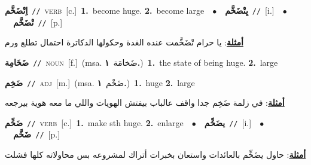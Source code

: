\documentclass[10pt,a4paper,twoside]{article} %
\begin{document}
\begin{multicols}{2}
{{{{{{{{{{\setlength\topsep{0pt}\textbf{\foreignlanguage{arabic}{اِتْضَخَّم}}\ {\color{gray}\texttt{//}\color{black}}\ \textsc{verb}\ [c.]\ \textbf{1.}~become huge.  \textbf{2.}~become large\ \ $\bullet$\ \ \setlength\topsep{0pt}\textbf{\foreignlanguage{arabic}{يِتْضَخَّم}}\ {\color{gray}\texttt{//}\color{black}}\ [i.]\ \ $\bullet$\ \ \setlength\topsep{0pt}\textbf{\foreignlanguage{arabic}{تْضَخَّم}}\ {\color{gray}\texttt{//}\color{black}}\ [p.]\  \begin{flushright}\color{gray}\foreignlanguage{arabic}{\textbf{\underline{\foreignlanguage{arabic}{أمثلة}}}: يا حرام تْضَخَّمت عنده الغدة وحكولها الدكاترة احتمال تطلع ورم}\end{flushright}\color{black}} \vspace{2mm}

{\setlength\topsep{0pt}\textbf{\foreignlanguage{arabic}{ضَخَامِة}}\ {\color{gray}\texttt{//}\color{black}}\ \textsc{noun}\ [f.]\ \color{gray}(msa. \foreignlanguage{arabic}{ضَخامَة}~\foreignlanguage{arabic}{\textbf{١.}})\color{black}\ \textbf{1.}~the state of being huge.  \textbf{2.}~large\ 

{\setlength\topsep{0pt}\textbf{\foreignlanguage{arabic}{ضَخِم}}\ {\color{gray}\texttt{//}\color{black}}\ \textsc{adj}\ [m.]\ \color{gray}(msa. \foreignlanguage{arabic}{ضَخْم}~\foreignlanguage{arabic}{\textbf{١.}})\color{black}\ \textbf{1.}~huge  \textbf{2.}~large\  \begin{flushright}\color{gray}\foreignlanguage{arabic}{\textbf{\underline{\foreignlanguage{arabic}{أمثلة}}}: في زلمة ضَخِم جدا واقف عالباب بيفتش الهويات واللي ما معه هوية بيرجعه}\end{flushright}\color{black}} \vspace{2mm}

{\setlength\topsep{0pt}\textbf{\foreignlanguage{arabic}{ضَخِّم}}\ {\color{gray}\texttt{//}\color{black}}\ \textsc{verb}\ [c.]\ \textbf{1.}~make sth huge.  \textbf{2.}~enlarge\ \ $\bullet$\ \ \setlength\topsep{0pt}\textbf{\foreignlanguage{arabic}{يضَخِّم}}\ {\color{gray}\texttt{//}\color{black}}\ [i.]\ \ $\bullet$\ \ \setlength\topsep{0pt}\textbf{\foreignlanguage{arabic}{ضَخَّم}}\ {\color{gray}\texttt{//}\color{black}}\ [p.]\  \begin{flushright}\color{gray}\foreignlanguage{arabic}{\textbf{\underline{\foreignlanguage{arabic}{أمثلة}}}: حاول يضَخِّم بالعائدات واستعان بخبرات أتراك لمشروعه بس محاولاته كلها فشلت}\end{flushright}\color{black}} \vspace{2mm}

}}}}}}}}}}
\end{multicols}
\end{document}
